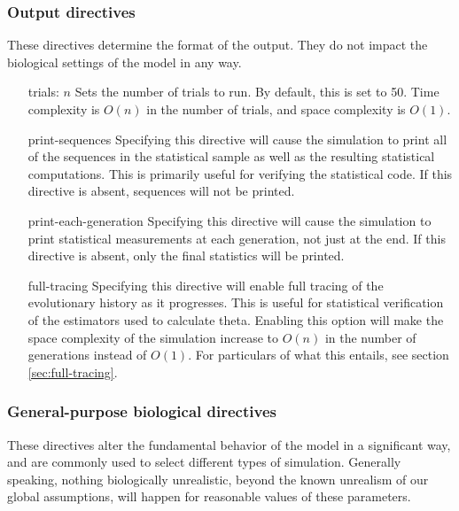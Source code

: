 \documentclass{article}
\begin{document}
      \subsubsection{Output directives}
        \label{sec:output-directives}

        These directives determine the format of the output. They do not impact
        the biological settings of the model in any way.

        \begin{enumerate}
          \item[trials: $n$]
          Sets the number of trials to run. By default, this is set to 50. Time
          complexity is $O(n)$ in the number of trials, and space complexity is
          $O(1)$.

          \item[print-sequences]
          Specifying this directive will cause the simulation to print all of
          the sequences in the statistical sample as well as the resulting
          statistical computations. This is primarily useful for verifying the
          statistical code. If this directive is absent, sequences will not be
          printed.

          \item[print-each-generation]
          Specifying this directive will cause the simulation to print
          statistical measurements at each generation, not just at the end. If
          this directive is absent, only the final statistics will be printed.

          \item[full-tracing]
          Specifying this directive will enable full tracing of the evolutionary
          history as it progresses. This is useful for statistical verification
          of the estimators used to calculate theta. Enabling this option will
          make the space complexity of the simulation increase to $O(n)$ in the
          number of generations instead of $O(1)$. For particulars of what this
          entails, see section \ref{sec:full-tracing}.
        \end{enumerate}

      \subsubsection{General-purpose biological directives}
        \label{sec:general-directives}

        These directives alter the fundamental behavior of the model in a
        significant way, and are commonly used to select different types of
        simulation. Generally speaking, nothing biologically unrealistic, beyond
        the known unrealism of our global assumptions, will happen for
        reasonable values of these parameters.
\end{document}
